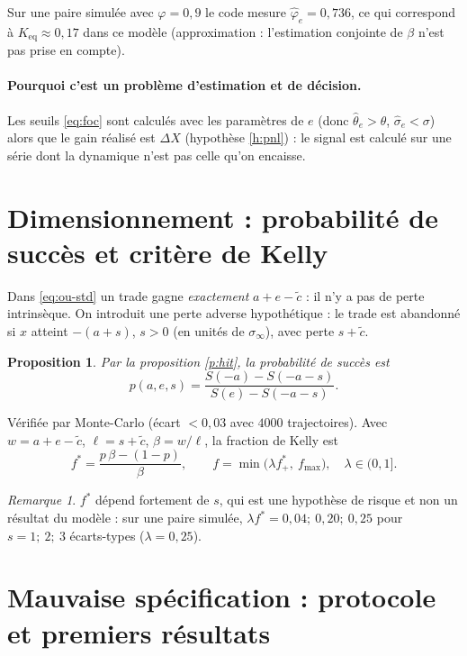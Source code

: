 \documentclass[11pt,a4paper]{article}
\newtheorem{proposition}{Proposition}
\theoremstyle{definition}
\theoremstyle{remark}
\newtheorem{remarque}{Remarque}
\newcommand{\sinf}{\sigma_\infty}
\begin{document}
Sur une paire simulée avec $\varphi=0{,}9$ le code mesure $\hat\varphi_e=0{,}736$, ce qui correspond à $K_{\mathrm{eq}}\approx0{,}17$ dans ce modèle
(approximation : l'estimation conjointe de $\beta$ n'est pas prise en compte).

\paragraph{Pourquoi c'est un problème d'estimation et de décision.} Les seuils \eqref{eq:foc} sont calculés avec les paramètres de $e$ (donc $\hat\theta_e>\theta$, $\hat\sigma_e<\sigma$)
alors que le gain réalisé est $\Delta X$ (hypothèse \ref{h:pnl}) : le signal est calculé sur une série dont la dynamique n'est pas celle qu'on encaisse.

\section{Dimensionnement : probabilité de succès et critère de Kelly}

Dans \eqref{eq:ou-std} un trade gagne \emph{exactement} $a+e-\tilde c$ : il n'y a pas de perte intrinsèque.
On introduit une perte adverse hypothétique : le trade est abandonné si $x$ atteint $-(a+s)$, $s>0$ (en unités de $\sinf$), avec perte $s+\tilde c$.

\begin{proposition}
Par la proposition \ref{p:hit}, la probabilité de succès est
\[
p(a,e,s)=\frac{S(-a)-S(-a-s)}{S(e)-S(-a-s)} .
\]
\end{proposition}
Vérifiée par Monte-Carlo (écart $<0{,}03$ avec $4000$ trajectoires). Avec $w=a+e-\tilde c$, $\ell=s+\tilde c$, $\beta=w/\ell$, la fraction de Kelly est
\[
f^*=\frac{p\,\beta-(1-p)}{\beta},\qquad f=\min\big(\lambda f^*_+,\ f_{\max}\big),\quad \lambda\in(0,1].
\]
\begin{remarque}
$f^*$ dépend fortement de $s$, qui est une hypothèse de risque et non un résultat du modèle : sur une paire simulée,
$\lambda f^*=0{,}04;\ 0{,}20;\ 0{,}25$ pour $s=1;\ 2;\ 3$ écarts-types ($\lambda=0{,}25$).
\end{remarque}

\section{Mauvaise spécification : protocole et premiers résultats}\label{sec:miss}
\end{document}
